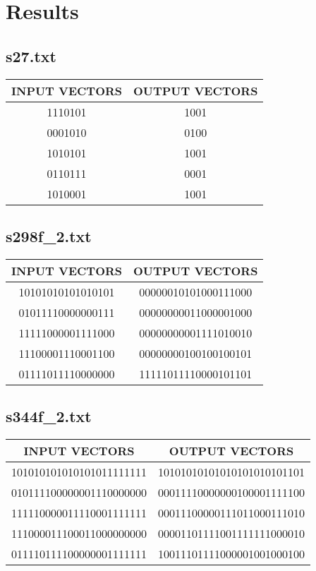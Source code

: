 \documentclass[paper=a4, fontsize=12pt]{scrartcl} %
\numberwithin{equation}{section} %
\numberwithin{figure}{section} %
\numberwithin{table}{section} %
\begin{document}
\newpage
\section{Results}
\subsection{s27.txt}
\begin{center}
\begin{tabular}{| c | c | }
\hline INPUT VECTORS &	OUTPUT VECTORS \\ \hline
1110101 & 1001 \\ \hline
0001010 &  0100 \\ \hline
1010101 & 1001 \\ \hline
0110111 & 0001 \\ \hline
1010001 & 1001 \\ \hline

\end{tabular}
\end{center}
\subsection{s298f\_2.txt}
\begin{center}
\begin{tabular}{| c | c | }
\hline INPUT VECTORS & OUTPUT VECTORS \\ \hline
10101010101010101 & 00000010101000111000 \\ \hline
01011110000000111 & 00000000011000001000 \\ \hline
11111000001111000	& 00000000001111010010 \\ \hline
11100001110001100 & 00000000100100100101 \\ \hline
01111011110000000 & 11111011110000101101 \\ \hline

\end{tabular}
\end{center}
\subsection{s344f\_2.txt}
\begin{center}
\begin{tabular}{| c | c | }
\hline INPUT VECTORS & OUTPUT VECTORS \\ \hline
101010101010101011111111 & 10101010101010101010101101 \\ \hline
010111100000001110000000 & 00011110000000100001111100 \\ \hline
111110000011110001111111 & 00011100000111011000111010 \\ \hline
111000011100011000000000 & 00001101111001111111000010 \\ \hline
011110111100000001111111 & 10011101111000001001000100 \\ \hline

\end{tabular}
\end{center}
\end{document}
